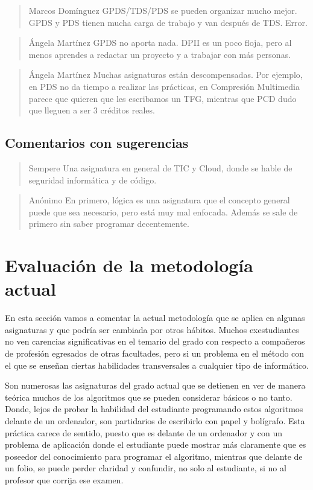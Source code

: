 \begin{quote}{Marcos Domínguez}
    GPDS/TDS/PDS se pueden organizar mucho mejor.
    GPDS y PDS tienen mucha carga de trabajo y van después de TDS.
    Error.
\end{quote}

\begin{quote}{Ángela Martínez}
    GPDS no aporta nada. DPII es un poco floja, pero al menos
    aprendes a redactar un proyecto y a trabajar con más personas.
\end{quote}

\begin{quote}{Ángela Martínez}
    Muchas asignaturas están descompensadas.
    Por ejemplo, en PDS no da tiempo a realizar las prácticas,
    en Compresión Multimedia parece que quieren que les escribamos un TFG,
    mientras que PCD dudo que lleguen a ser 3 créditos reales.
\end{quote}

\subsection{Comentarios con sugerencias}

\begin{quote}{Sempere}
    Una asignatura en general de TIC y Cloud,
    donde se hable de seguridad informática y de código.
\end{quote}

\begin{quote}{Anónimo}
    En primero, lógica es una asignatura que el concepto general puede que
    sea necesario, pero está muy mal enfocada. Además se sale de primero
    sin saber programar decentemente.
\end{quote}

\section{Evaluación de la metodología actual}

En esta sección vamos a comentar la actual metodología
que se aplica en algunas asignaturas y que podría ser
cambiada por otros hábitos. Muchos exestudiantes no ven 
carencias significativas en el temario del grado con 
respecto a compañeros de profesión egresados de otras 
facultades, pero si un problema en el método con el que 
se enseñan ciertas habilidades transversales a cualquier 
tipo de informático.

Son numerosas las asignaturas del grado actual que 
se detienen en ver de manera teórica muchos de los
algoritmos que se pueden considerar básicos o no tanto.
Donde, lejos de probar la habilidad del estudiante programando
estos algoritmos delante de un ordenador, son partidarios
de escribirlo con papel y bolígrafo. Esta práctica carece 
de sentido, puesto que es delante de un ordenador y con 
un problema de aplicación donde el estudiante puede mostrar 
más claramente que es poseedor del conocimiento para programar
el algoritmo, mientras que delante de un folio, se puede perder 
claridad y confundir, no solo al estudiante, si no al profesor que 
corrija ese examen.

